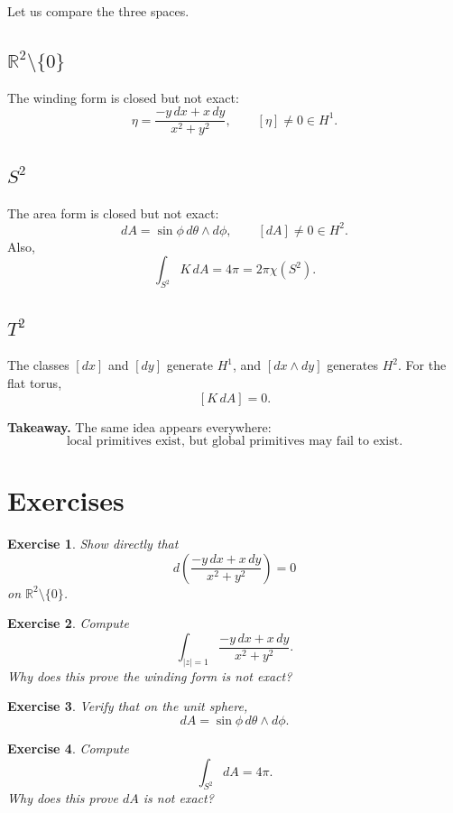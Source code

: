 \documentclass[11pt]{article}
\newtheorem{exercise}{Exercise}
\newenvironment{takeaway}
{\begin{framed}\noindent\textbf{Takeaway. }}
{\end{framed}}
\begin{document}
Let us compare the three spaces.

\subsection*{\(\mathbb{R}^2\setminus\{0\}\)}
The winding form is closed but not exact:
\[
\eta=\frac{-y\,dx+x\,dy}{x^2+y^2},\qquad [\eta]\neq 0\in H^1.
\]

\subsection*{\(S^2\)}
The area form is closed but not exact:
\[
dA=\sin\phi\,d\theta\wedge d\phi,\qquad [dA]\neq 0\in H^2.
\]
Also,
\[
\int_{S^2}K\,dA=4\pi=2\pi\chi(S^2).
\]

\subsection*{\(T^2\)}
The classes \([dx]\) and \([dy]\) generate \(H^1\), and \([dx\wedge dy]\) generates \(H^2\). For the flat torus,
\[
[K\,dA]=0.
\]

\begin{takeaway}
The same idea appears everywhere:
\[
\boxed{\text{local primitives exist, but global primitives may fail to exist.}}
\]
\end{takeaway}

\section{Exercises}

\begin{exercise}
Show directly that
\[
d\!\left(\frac{-y\,dx+x\,dy}{x^2+y^2}\right)=0
\]
on \(\mathbb{R}^2\setminus\{0\}\).
\end{exercise}

\begin{exercise}
Compute
\[
\int_{|z|=1}\frac{-y\,dx+x\,dy}{x^2+y^2}.
\]
Why does this prove the winding form is not exact?
\end{exercise}

\begin{exercise}
Verify that on the unit sphere,
\[
dA=\sin\phi\,d\theta\wedge d\phi.
\]
\end{exercise}

\begin{exercise}
Compute
\[
\int_{S^2}dA=4\pi.
\]
Why does this prove \(dA\) is not exact?
\end{exercise}
\end{document}
